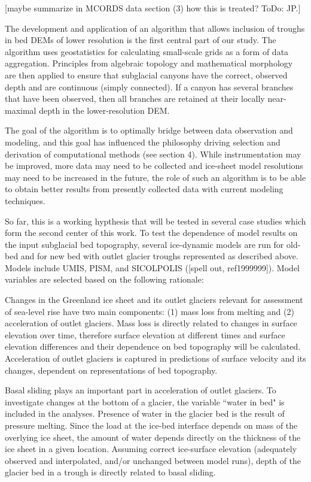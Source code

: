 \documentclass[11pt]{article}
\begin{document}
[maybe summarize in MCORDS data section (3) how this is treated? ToDo: JP.]

The development and application of an algorithm that allows inclusion of troughs in bed DEMs of lower resolution is the first central part of our study.  The algorithm uses  geostatistics for calculating small-scale grids
as a form of data aggregation. Principles from algebraic topology and mathematical morphology are then applied to ensure that subglacial canyons have the correct, observed depth and are continuous (simply connected). If a canyon has several branches that have been observed, then all branches are retained at their 
locally near-maximal depth  in the lower-resolution DEM.

The goal of the algorithm is to optimally bridge between data observation and modeling, and this goal has influenced the philosophy driving selection and  derivation of computational methods (see section 4). 
While instrumentation may be improved, more data may need to be collected and ice-sheet model resolutions
may need to be increased in the future, the role of such an algorithm is to be able to obtain better results from 
presently collected data with current modeling techniques. 

So far, this is a working hypthesis that will be tested in several case studies which form the second center of this work. To test the dependence of model results on the input subglacial bed topography, several ice-dynamic models  are run for old-bed and for new bed with outlet glacier troughs represented as described above.
Models include UMIS, PISM, and SICOLPOLIS ([spell out, ref1999999]).
Model variables are selected based on the following rationale:


 Changes in the Greenland ice sheet and its outlet glaciers relevant for assessment of sea-level rise have two main components: (1) mass loss from melting and (2) acceleration of outlet glaciers.
 Mass loss is directly related to changes in surface elevation over time, therefore surface elevation at different times  and surface elevation differences and their dependence on bed topography will be calculated.
 Acceleration of outlet glaciers is captured in  predictions of surface velocity and its changes, dependent on representations of bed topography. 
 
 Basal sliding plays an important part in acceleration of outlet glaciers.
 To investigate changes at the bottom of a glacier, the variable ``water in bed" is included in the analyses.
  Presence of water in the glacier bed is the result of pressure melting. Since the load at the ice-bed interface
 depends on mass of the overlying ice sheet, the amount of water depends directly on the thickness of the ice sheet in a given location. Assuming correct ice-surface elevation (adequately observed and interpolated, and/or unchanged between model runs), depth of the glacier bed in a trough is directly related to basal sliding.
\end{document}
